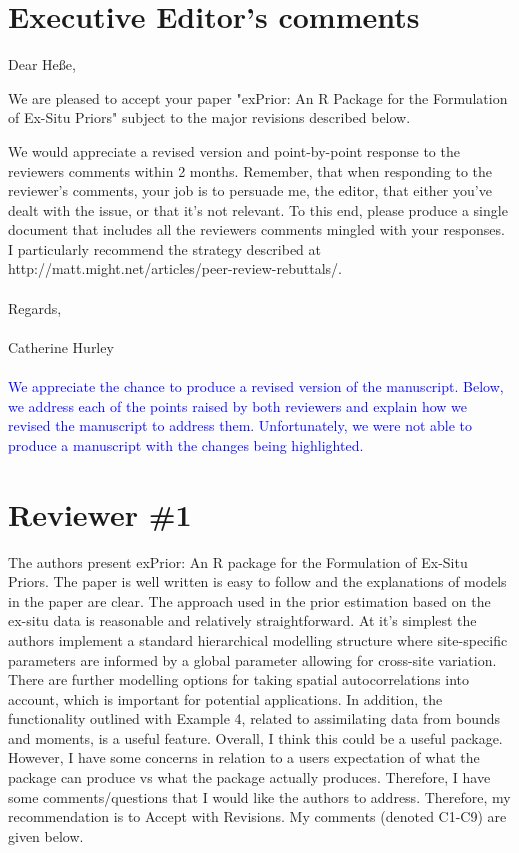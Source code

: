 \documentclass{article}
\begin{document}
\section{Executive Editor's comments}

Dear He{\ss}e,

We are pleased to accept your paper "exPrior: An R Package for the Formulation of Ex-Situ Priors" subject to the major revisions described below.

We would appreciate a revised version and point-by-point response to the reviewers comments within 2 months. Remember, that when responding to the reviewer's comments, your job is to persuade me, the editor, that either you've dealt with the issue, or that it's not relevant. To this end, please produce a single document that includes all the reviewers comments mingled with your responses. I particularly recommend the strategy described at http://matt.might.net/articles/peer-review-rebuttals/.
\\ \\
Regards,
\\ \\
Catherine Hurley \\ \\
\textcolor{blue}{We appreciate the chance to produce a revised version of the manuscript. Below, we address each of the points raised by both reviewers and explain how we revised the manuscript to address them. Unfortunately, we were not able to produce a manuscript with the changes being highlighted.}


\newpage
\section*{Reviewer \#1}

The authors present exPrior: An R package for the Formulation of Ex-Situ Priors. The paper is well
written is easy to follow and the explanations of models in the paper are clear. The approach used in the
prior estimation based on the ex-situ data is reasonable and relatively straightforward. At it’s simplest the
authors implement a standard hierarchical modelling structure where site-specific parameters are informed
by a global parameter allowing for cross-site variation. There are further modelling options for taking spatial
autocorrelations into account, which is important for potential applications. In addition, the functionality
outlined with Example 4, related to assimilating data from bounds and moments, is a useful feature. Overall,
I think this could be a useful package.
However, I have some concerns in relation to a users expectation of what the package can produce vs what
the package actually produces. Therefore, I have some comments/questions that I would like the authors to
address. Therefore, my recommendation is to Accept with Revisions.
My comments (denoted C1-C9) are given below.
\end{document}

